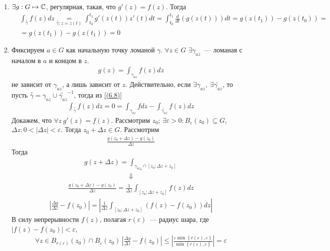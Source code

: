 \begin{enumerate}
    \item $\exists g:G \mapsto \mathbb{C}$, регулярная, такая, что $g'(z) = f(z)$.
    Тогда
    \begin{align*}
      & \int_{\overset{\circ}{\gamma}} f(z) dz \underset{\overset{\circ}{\gamma}: z = z(t)}{=} \int_{t_0}^{t_1} g'(z(t))z'(t)dt = \int_{t_0}^{t_1}\frac{d}{dt}(g(z(t)))dt = g(z(t_1)) - g(z(t_0)) = \\
      & = g(z(t_1)) - g(z(t_1)) = 0
    \end{align*}
    \item Фиксируем $a \in G$ как начальную точку ломаной $\gamma$. $\forall z
    \in G$ $\exists \gamma_{az}$~--- ломаная с началом в $a$ и концом в $z$.
    \begin{align*}
      & g(z) = \int_{\gamma_{az}} f(z) dz
    \end{align*}
    не зависит от $\gamma_{az}$, а лишь зависит от $z$. Действительно, если
    $\exists \gamma_{az}, \ \exists \tilde{\gamma_{az}}$, то пусть
    $\overset{\circ}{\gamma} = \gamma_{az} \cup \tilde{\gamma_{az}}^{-1}$,
    тогда из \eqref{(6.8)}
    \begin{align*}
      & \int_{\overset{\circ}{\gamma}} f(z) dz = 0 = \int_{\gamma_{az}}f dz - \int_{\tilde{\gamma_{az}}}f(z)dz
    \end{align*}
    Докажем, что $\forall z \ g'(z) = f(z)$. Рассмотрим $z_0$; $\exists
    \varepsilon > 0: B_{\varepsilon}(z_0) \subseteq G$, $\Delta z: 0 <
    \left| \Delta z \right| < \varepsilon$. Тогда $z_0 + \Delta z \in G$.
    Рассмотрим
    \begin{align*}
      & \frac{g(z_0+\Delta z) - g(z_0)}{\Delta z}
    \end{align*}
    Тогда
    \begin{align*}
      & g(z+ \Delta z) = \int_{\gamma_{az_0} \cap [z_0; \Delta z + z_0]}
    \end{align*}
    \begin{align*}
      & \Downarrow
    \end{align*}
    \begin{align*}
      & \frac{g(z_0+ \Delta z) - g(z_0)}{\Delta z} = \frac{1}{\Delta z} \int_{[z_0; \Delta z + z_0]} f(z)dz
    \end{align*}
    \begin{align*}
      & \left| \frac{\Delta g}{\Delta z} - f(z_0) \right| = \left| \frac{1}{\Delta z} \int_{[z_0; \Delta z + z_0]}(f(z) - f(z_0))dz \right|
    \end{align*}
    В силу непрерывности $f(z)$, полагая $r(\varepsilon)$~--- радиус шара, где
    $\left| f(z) - f(z_0) \right| < \varepsilon$,
    \begin{align*}
      & \forall z \in B_{r(\varepsilon)}(z_0)\cap B_\varepsilon(z_0) \ \left| \frac{\Delta g}{\Delta z} - f(z_0) \right| \leq \left| \frac{\varepsilon\min\left\{ r(\varepsilon), \varepsilon \right\}}{\min\left\{ r(\varepsilon), \varepsilon \right\}} \right| = \varepsilon
    \end{align*}
\end{enumerate}
